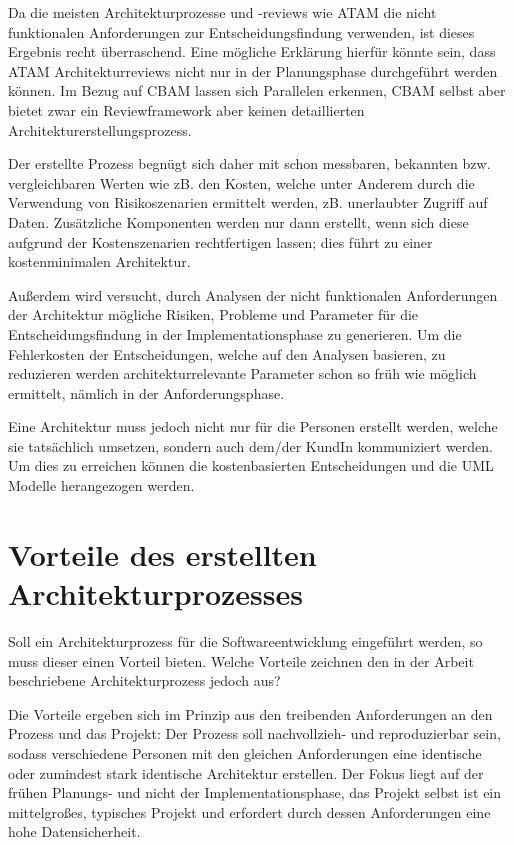 Da die meisten Architekturprozesse und -reviews wie ATAM die nicht funktionalen Anforderungen zur Entscheidungsfindung verwenden, ist dieses Ergebnis recht überraschend. Eine mögliche Erklärung hierfür könnte sein, dass ATAM Architekturreviews nicht nur in der Planungsphase durchgeführt werden können. Im Bezug auf CBAM lassen sich Parallelen erkennen, CBAM selbst aber bietet zwar ein Reviewframework aber keinen detaillierten Architekturerstellungsprozess.

Der erstellte Prozess begnügt sich daher mit schon messbaren, bekannten bzw. vergleichbaren Werten wie zB. den Kosten, welche unter Anderem durch die Verwendung von Risikoszenarien ermittelt werden, zB. unerlaubter Zugriff auf Daten. Zusätzliche Komponenten werden nur dann erstellt, wenn sich diese aufgrund der Kostenszenarien rechtfertigen lassen; dies führt zu einer kostenminimalen Architektur.

Außerdem wird versucht, durch Analysen der nicht funktionalen Anforderungen der Architektur mögliche Risiken, Probleme und Parameter für die Entscheidungsfindung in der Implementationsphase zu generieren. Um die Fehlerkosten der Entscheidungen, welche auf den Analysen basieren, zu reduzieren werden architekturrelevante Parameter schon so früh wie möglich ermittelt, nämlich in der Anforderungsphase.

Eine Architektur muss jedoch nicht nur für die Personen erstellt werden, welche sie tatsächlich umsetzen, sondern auch dem/der KundIn kommuniziert werden. Um dies zu erreichen können die kostenbasierten Entscheidungen und die UML Modelle herangezogen werden.


\section{Vorteile des erstellten Architekturprozesses}
Soll ein Architekturprozess für die Softwareentwicklung eingeführt werden, so muss dieser einen Vorteil bieten. Welche Vorteile zeichnen den in der Arbeit beschriebene Architekturprozess jedoch aus?

Die Vorteile ergeben sich im Prinzip aus den treibenden Anforderungen an den Prozess und das Projekt: Der Prozess soll nachvollzieh- und reproduzierbar sein, sodass verschiedene Personen mit den gleichen Anforderungen eine identische oder zumindest stark identische Architektur erstellen. Der Fokus liegt auf der frühen Planungs- und nicht der Implementationsphase, das Projekt selbst ist ein mittelgroßes, typisches Projekt und erfordert durch dessen Anforderungen eine hohe Datensicherheit.

